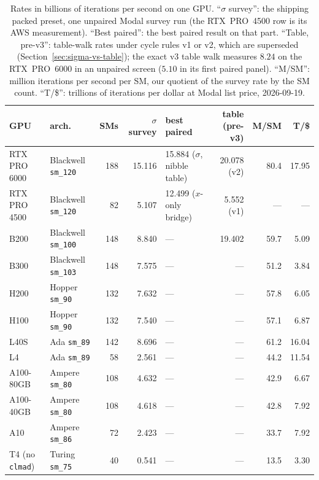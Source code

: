 \begin{table}[t]
\centering
\footnotesize
\setlength{\tabcolsep}{4pt}
\caption{Rates in billions of iterations per second on one GPU.
  ``$\sigma$ survey'': the shipping packed preset, one unpaired Modal
  survey run (the RTX~PRO~4500 row is its AWS measurement). ``Best
  paired'': the best paired result on that part. ``Table, pre-v3'':
  table-walk rates under cycle rules v1 or v2, which are superseded
  (Section~\ref{sec:sigma-vs-table}); the exact v3 table walk measures
  $8.24$ on the RTX~PRO~6000 in an unpaired screen ($5.10$ in its first paired panel). ``M/SM'': million iterations per second per SM, our quotient of the
  survey rate by the SM count. ``T/\$'': trillions of iterations per dollar at
  Modal list price, 2026-09-19.}
\label{tab:survey}
\begin{tabular}{@{}llrrlrrr@{}}
\toprule
GPU & arch. & SMs & $\sigma$ survey & best paired & table (pre-v3) & M/SM & T/\$ \\
\midrule
RTX PRO 6000 & Blackwell \texttt{sm\_120} & 188 & 15.116 & 15.884 ($\sigma$, nibble table) & 20.078 (v2) & 80.4 & 17.95 \\
RTX PRO 4500 & Blackwell \texttt{sm\_120} & 82 & 5.107 & 12.499 ($x$-only bridge) & 5.552 (v1) & --- & --- \\
B200 & Blackwell \texttt{sm\_100} & 148 & 8.840 & --- & 19.402 & 59.7 & 5.09 \\
B300 & Blackwell \texttt{sm\_103} & 148 & 7.575 & --- & --- & 51.2 & 3.84 \\
H200 & Hopper \texttt{sm\_90} & 132 & 7.632 & --- & --- & 57.8 & 6.05 \\
H100 & Hopper \texttt{sm\_90} & 132 & 7.540 & --- & --- & 57.1 & 6.87 \\
L40S & Ada \texttt{sm\_89} & 142 & 8.696 & --- & --- & 61.2 & 16.04 \\
L4 & Ada \texttt{sm\_89} & 58 & 2.561 & --- & --- & 44.2 & 11.54 \\
A100-80GB & Ampere \texttt{sm\_80} & 108 & 4.632 & --- & --- & 42.9 & 6.67 \\
A100-40GB & Ampere \texttt{sm\_80} & 108 & 4.618 & --- & --- & 42.8 & 7.92 \\
A10 & Ampere \texttt{sm\_86} & 72 & 2.423 & --- & --- & 33.7 & 7.92 \\
T4 (no \texttt{clmad}) & Turing \texttt{sm\_75} & 40 & 0.541 & --- & --- & 13.5 & 3.30 \\
\bottomrule
\end{tabular}
\end{table}

